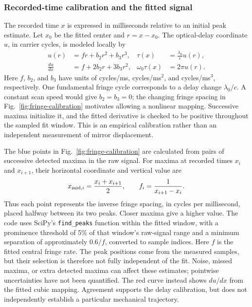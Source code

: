\subsubsection{Recorded-time calibration and the fitted signal}
The recorded time $x$ is expressed in milliseconds relative to an initial peak estimate. Let $x_0$ be the fitted center and $r=x-x_0$. The optical-delay coordinate $u$, in carrier cycles, is modeled locally by
\begin{align}
u(r)&=fr+b_2r^2+b_3r^3,&
\tau(x)&=\frac{\lambda_0}{c}u(r),\\
\frac{du}{dx}&=f+2b_2r+3b_3r^2,&
\omega_0\tau(x)&=2\pi u(r).
\end{align}
Here $f$, $b_2$, and $b_3$ have units of cycles/ms, cycles/ms$^2$, and cycles/ms$^3$, respectively. One fundamental fringe cycle corresponds to a delay change $\lambda_0/c$. A constant scan speed would give $b_2=b_3=0$; the changing fringe spacing in Fig.~\ref{fig:fringe-calibration} motivates allowing a nonlinear mapping. Successive maxima initialize it, and the fitted derivative is checked to be positive throughout the sampled fit window. This is an empirical calibration rather than an independent measurement of mirror displacement.

The blue points in Fig.~\ref{fig:fringe-calibration} are calculated from pairs of successive detected maxima in the raw signal. For maxima at recorded times $x_i$ and $x_{i+1}$, their horizontal coordinate and vertical value are
\begin{equation}
x_{{\rm mid},i}=\frac{x_i+x_{i+1}}{2},
\qquad f_i=\frac{1}{x_{i+1}-x_i}.
\end{equation}
Thus each point represents the inverse fringe spacing, in cycles per millisecond, placed halfway between its two peaks. Closer maxima give a higher value. The code uses SciPy's \texttt{find\_peaks} function within the fitted window, with a prominence threshold of 5\% of that window's raw-signal range and a minimum separation of approximately $0.6/f$, converted to sample indices. Here $f$ is the fitted central fringe rate. The peak positions come from the measured samples, but their selection is therefore not fully independent of the fit. Noise, missed maxima, or extra detected maxima can affect these estimates; pointwise uncertainties have not been quantified. The red curve instead shows $du/dx$ from the fitted cubic mapping. Agreement supports the delay calibration, but does not independently establish a particular mechanical trajectory.

